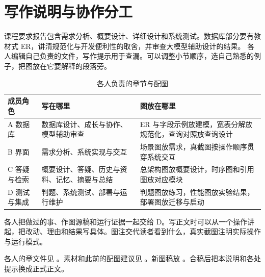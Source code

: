 \section*{写作说明与协作分工}
课程要求报告包含需求分析、概要设计、详细设计和系统测试。数据库部分要有教材式 ER，讲清规范化与开发便利性的取舍，并审查大模型辅助设计的结果\cite{course}。
各人编辑自己负责的文件，写作提示用于查漏。可以调整小节顺序，选自己熟悉的例子，把图放在它要解释的段落旁。

\begin{table}[htbp]\centering\small
\begin{tabularx}{\linewidth}{lYY}
\toprule 成员角色 & 写在哪里 & 图放在哪里\\\midrule
A 数据库 & 数据库设计、成长与协作、模型辅助审查 & ER 与字段示例放建模，宽表分解放规范化，查询对照放查询设计\\
B 界面 & 需求分析、系统实现与交互 & 场景图放需求，真截图按操作顺序贯穿系统交互\\
C 答疑与检索 & 概要设计、答疑、历史与资料、记忆、摘要与总结 & 总架构图放概要设计，时序图和引用图放对应模块\\
D 测试与集成 & 判题、系统测试、部署与运行维护 & 判题图放练习，性能图放实验结果，部署图放迁移与启动\\\bottomrule
\end{tabularx}
\caption{各人负责的章节与配图}
\end{table}

各人把做过的事、作图源稿和运行证据一起交给 D。写正文时可以从一个操作讲起，把改动、理由和结果写具体。图注交代读者看到什么，真实截图注明实际操作与运行模式。

各人的章文件见 。素材和此前的配图建议见 。新图稿放 。合稿后把本说明和各处提示换成正式正文。

